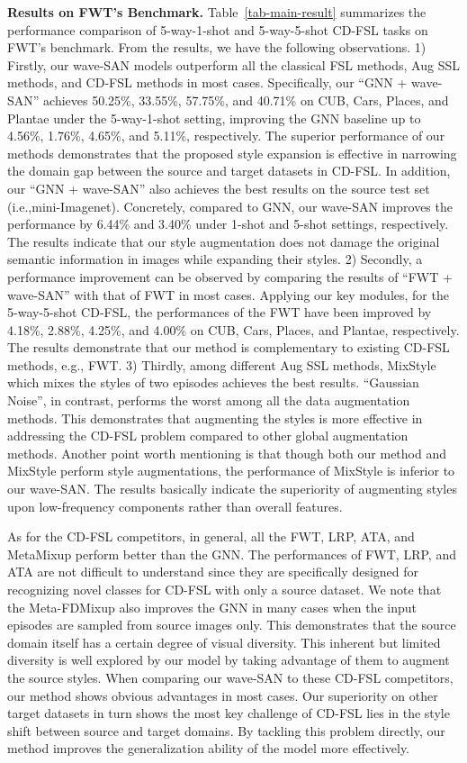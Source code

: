 \documentclass{article}
\begin{document}
	
\noindent\textbf{Results on FWT's Benchmark.} Table~\ref{tab-main-result} summarizes the performance comparison of 5-way-1-shot and 5-way-5-shot CD-FSL tasks on FWT's benchmark. 
From the results, we have the following observations. 1) Firstly, our wave-SAN models outperform all the classical FSL methods, Aug  SSL methods, and CD-FSL methods in most cases. Specifically, our ``GNN + wave-SAN'' achieves 50.25\%, 33.55\%, 57.75\%, and 40.71\% on CUB, Cars, Places, and Plantae under the 5-way-1-shot setting, improving the GNN baseline up to 4.56\%, 1.76\%, 4.65\%, and 5.11\%, respectively. The superior performance of our methods demonstrates that the proposed style expansion is effective in narrowing the domain gap between the source and target datasets in CD-FSL. 
In addition, our ``GNN + wave-SAN'' also achieves the best results on the source test set (i.e.,mini-Imagenet). Concretely, compared to GNN, our wave-SAN improves the performance by 6.44\% and 3.40\% under 1-shot and 5-shot settings, respectively. The results indicate that our style augmentation does not damage the original semantic information in images while expanding their styles. 
2) Secondly, a performance improvement can be observed by comparing the results of ``FWT + wave-SAN'' with that of FWT in most cases. Applying our key modules, for the 5-way-5-shot CD-FSL, the performances of the FWT have been improved by 4.18\%, 2.88\%, 4.25\%, and 4.00\% on CUB, Cars, Places, and Plantae, respectively. The results demonstrate that our method is complementary to existing CD-FSL methods, e.g., FWT. 
3) Thirdly, among different Aug  SSL methods, MixStyle which mixes the styles of two episodes achieves the best results. ``Gaussian Noise'', in contrast, performs the worst among all the data augmentation methods. This demonstrates that augmenting the styles is more effective in addressing the CD-FSL problem compared to other global augmentation methods. Another point worth mentioning is that though both our method and MixStyle perform style augmentations, the performance of MixStyle is inferior to our wave-SAN. The results basically indicate the superiority of augmenting styles upon low-frequency components rather than overall features. 

As for the CD-FSL competitors, in general, all the FWT, LRP, ATA, and MetaMixup perform better than the GNN. The performances of FWT, LRP, and ATA are not difficult to understand since they are specifically designed for recognizing novel classes for CD-FSL with only a source dataset. We note that the Meta-FDMixup also improves the GNN in many cases when the input episodes are sampled from source images only. This demonstrates that the source domain itself has a certain degree of visual diversity. This inherent but limited diversity is well explored by our model by taking advantage of them to augment the source styles. When comparing our wave-SAN to these CD-FSL competitors, our method shows obvious advantages in most cases. 
Our superiority on other target datasets in turn shows the most key challenge of CD-FSL lies in the style shift between source and target domains. By tackling this problem directly, our method improves the generalization ability of the model more effectively.
\end{document}
